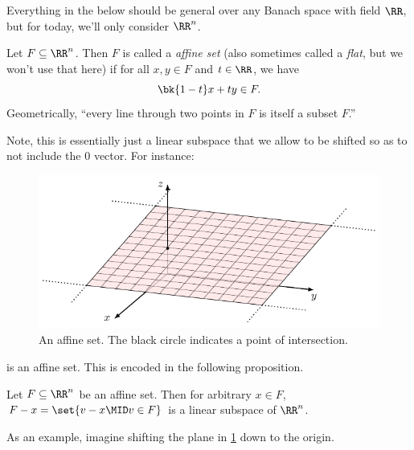 Everything in the below should be general over any Banach space with
field $\RR$, but for today, we'll only consider $\RR^n$.%
\begin{definition}
  Let $F \subseteq \RR^n$. Then $F$ is called a \emph{affine set}
  (also sometimes called a \emph{flat}, but we won't use that here) if
  for all $x,y \in F$ and $t \in \RR$, we have
  \[
    \bk{1-t} x + ty \in F.
  \]
  Geometrically, ``every line through two points in $F$ is itself a
  subset $F$.''
\end{definition}
Note, this is essentially just a linear subspace that we allow to be
shifted so as to not include the $0$ vector. For instance:
\begin{figure}[H]
  \centering
  \includegraphics{figures/wild/affine-set.pdf}
  \caption[An affine set]{An affine set. The black circle indicates a
    point of intersection.}
  \label{fig:affine-set}
\end{figure}
\noindent is an affine set. This is encoded in the following
proposition.
\begin{proposition}\label{prop:affine-to-linear}
  Let $F \subseteq \RR^n$ be an affine set. Then for arbitrary $x \in
  F$, $F - x = \set{v - x \MID v \in F}$ is a linear subspace of
  $\RR^n$.
\end{proposition}
As an example, imagine shifting the plane in \cref{fig:affine-set}
down to the origin.

